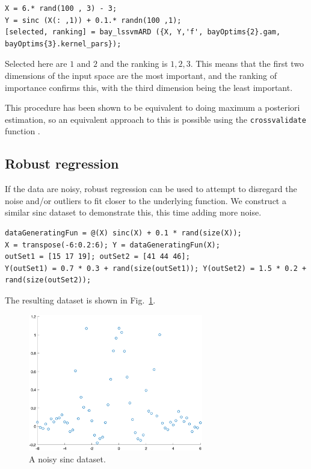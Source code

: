 \documentclass[10pt,a4paper]{article}
\begin{document}
\begin{lstlisting}[style=Matlab-editor, frame=single]
X = 6.* rand(100 , 3) - 3;
Y = sinc (X(: ,1)) + 0.1.* randn(100 ,1);
[selected, ranking] = bay_lssvmARD ({X, Y,'f', bayOptims{2}.gam, bayOptims{3}.kernel_pars});
\end{lstlisting}

Selected here are $1$ and $2$ and the ranking is $1, 2, 3$. This means that the first two dimensions of the input space are the most important, and the ranking of importance confirms this, with the third dimension being the least important.

This procedure has been shown to be equivalent to doing maximum a posteriori estimation, so an equivalent approach to this is possible using the \texttt{crossvalidate} function \cite{wipfNewViewAutomatic}.

\subsection{Robust regression}
If the data are noisy, robust regression can be used to attempt to disregard the noise and/or outliers to fit closer to the underlying function. We construct a similar sinc dataset to demonstrate this, this time adding more noise.

\begin{lstlisting}[style=Matlab-editor, frame=single]
dataGeneratingFun = @(X) sinc(X) + 0.1 * rand(size(X));
X = transpose(-6:0.2:6); Y = dataGeneratingFun(X);
outSet1 = [15 17 19]; outSet2 = [41 44 46];
Y(outSet1) = 0.7 * 0.3 + rand(size(outSet1)); Y(outSet2) = 1.5 * 0.2 + rand(size(outSet2)); 
\end{lstlisting}

The resulting dataset is shown in Fig.~\ref{fig:noisyData}.

\begin{figure}[h!]
\centering
  \includegraphics[width=3in]{noisyData.png}
  \caption{A noisy sinc dataset.}
  \label{fig:noisyData}
\end{figure}
\end{document}
